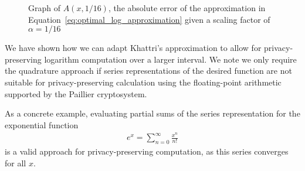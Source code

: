 \begin{figure}[ht]
	\centering
	\caption{Graph of $A(x,1/16)$, the absolute error of the approximation in Equation~\ref{eq:optimal_log_approximation} given a scaling factor of $\alpha=1/16$}
	\label{fig:single_alpha_plot}
\end{figure}

We have shown how we can adapt Khattri's approximation to allow for privacy-preserving logarithm computation over a larger interval. We note we only require the quadrature approach if series representations of the desired function are not suitable for privacy-preserving calculation using the floating-point arithmetic supported by the Paillier cryptosystem.

As a concrete example, evaluating partial sums of the series representation for the exponential function
\begin{align*}
	e^x = \sum_{n=0}^{\infty}{\frac{x^n}{n!}}
\end{align*}
is a valid approach for privacy-preserving computation, as this series converges for all $x$.
